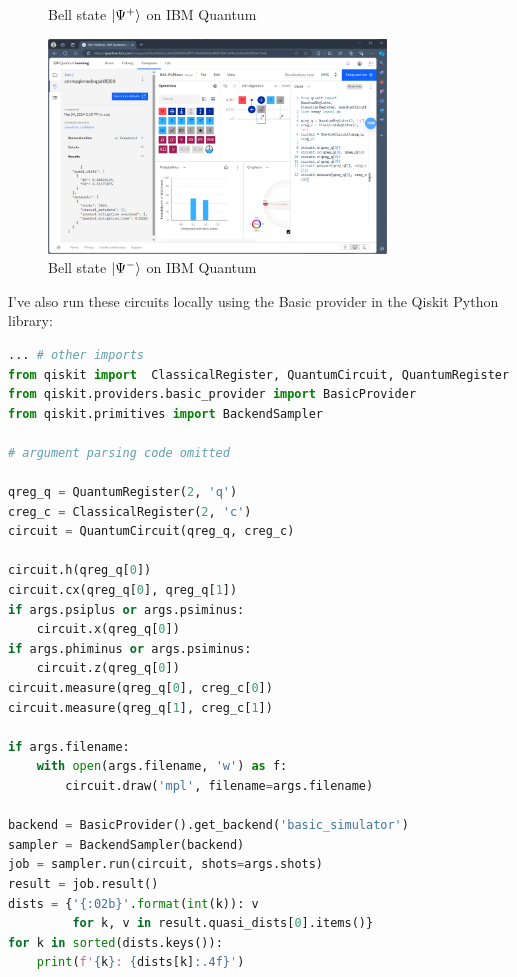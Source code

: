 \documentclass[12pt]{extarticle}
\begin{document}
\begin{enumerate}[(a)]
\begin{figure}[H]
\caption{Bell state $\ket{\Psi^{+}}$ on IBM Quantum}
\end{figure}
\begin{figure}[H]
\centering
\includegraphics[width=0.80\textwidth]{images/Bell-PsiMinus-IBM-Quantum.png}
\caption{Bell state $\ket{\Psi^{-}}$ on IBM Quantum}
\end{figure}

I've also run these circuits locally using the Basic provider in the Qiskit Python library:
\begin{footnotesize}
\begin{lstlisting}[language=Python]
... # other imports
from qiskit import  ClassicalRegister, QuantumCircuit, QuantumRegister
from qiskit.providers.basic_provider import BasicProvider
from qiskit.primitives import BackendSampler

# argument parsing code omitted

qreg_q = QuantumRegister(2, 'q')
creg_c = ClassicalRegister(2, 'c')
circuit = QuantumCircuit(qreg_q, creg_c)

circuit.h(qreg_q[0])
circuit.cx(qreg_q[0], qreg_q[1])
if args.psiplus or args.psiminus:
    circuit.x(qreg_q[0])
if args.phiminus or args.psiminus:
    circuit.z(qreg_q[0])
circuit.measure(qreg_q[0], creg_c[0])
circuit.measure(qreg_q[1], creg_c[1])

if args.filename:
    with open(args.filename, 'w') as f:
        circuit.draw('mpl', filename=args.filename)

backend = BasicProvider().get_backend('basic_simulator')
sampler = BackendSampler(backend)
job = sampler.run(circuit, shots=args.shots)
result = job.result()
dists = {'{:02b}'.format(int(k)): v
         for k, v in result.quasi_dists[0].items()}
for k in sorted(dists.keys()):
    print(f'{k}: {dists[k]:.4f}')
\end{lstlisting}
\end{footnotesize}


\end{enumerate}
\end{document}

